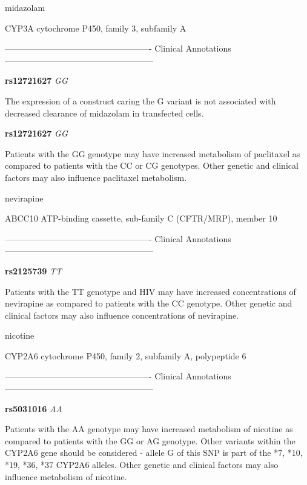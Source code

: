 \documentclass{resume} %
\begin{document}
\begin{rSection}{ midazolam }
\begin{rSubsection}{ CYP3A }{ cytochrome P450, family 3, subfamily A }{}{}
\item[] ---------------------------------------------------- Clinical Annotations -----------------------------------------------------\newline
\item \textbf{ rs12721627 } \textit{ GG }
\item[] The expression of a construct caring the G variant is not associated with decreased clearance of midazolam in transfected cells.\item \textbf{ rs12721627 } \textit{ GG }
\item[] Patients with the GG genotype may have increased metabolism of paclitaxel as compared to patients with the CC or CG genotypes. Other genetic and clinical factors may also influence paclitaxel metabolism.
\end{rSubsection}

\end{rSection}\begin{rSection}{ nevirapine }
\item[]

\begin{rSubsection}{ ABCC10 }{ ATP-binding cassette, sub-family C (CFTR/MRP), member 10 }{}{}
\item[]

\item[] ---------------------------------------------------- Clinical Annotations -----------------------------------------------------\newline
\item \textbf{ rs2125739 } \textit{ TT }
\item[] Patients with the TT genotype and HIV may have increased concentrations of nevirapine as compared to patients with the CC genotype. Other genetic and clinical factors may also influence concentrations of nevirapine.
\end{rSubsection}

\end{rSection}\begin{rSection}{ nicotine }
\item[]

\begin{rSubsection}{ CYP2A6 }{ cytochrome P450, family 2, subfamily A, polypeptide 6 }{}{}
\item[]

\item[] ---------------------------------------------------- Clinical Annotations -----------------------------------------------------\newline
\item \textbf{ rs5031016 } \textit{ AA }
\item[] Patients with the AA genotype may have increased metabolism of nicotine as compared to patients with the GG or AG genotype. Other variants within the CYP2A6 gene should be considered - allele G of this SNP is part of the *7, *10, *19, *36, *37 CYP2A6 alleles. Other genetic and clinical factors may also influence metabolism of nicotine.
\end{rSubsection}


\end{rSection}
\end{document}
